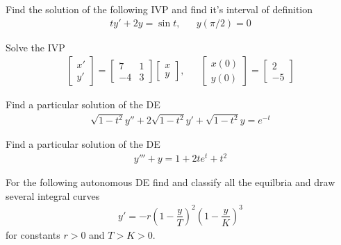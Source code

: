 \documentclass[11pt]{exam}
\begin{document}
\begin{questions}
		\addpoints
		\question[25] Find the solution of the following IVP and find it's interval of definition
		\begin{align*}
			ty' + 2y = \sin t, &   & y(\pi / 2) = 0
		\end{align*}
		\newpage







		\addpoints
		\question[25] Solve the IVP
		\begin{align*}
			\begin{bmatrix} x' \\ y' \end{bmatrix} = \begin{bmatrix} 7 & 1 \\ -4 & 3\end{bmatrix} \begin{bmatrix} x \\ y\end{bmatrix}, &&\begin{bmatrix} x(0) \\ y(0) \end{bmatrix} = \begin{bmatrix} 2 \\ -5\end{bmatrix}
		\end{align*}
		\newpage







		\addpoints
		\question[25] Find a particular solution of the DE
		\begin{align*}
			\sqrt{1 - t ^ 2} y'' + 2 \sqrt{1 - t ^ 2} y' + \sqrt{1 - t ^ 2}y = e ^ {-t}
		\end{align*}
		\newpage






		\addpoints
		\question[25] Find a particular solution of the DE
		\begin{align*}
			y''' + y = 1 + 2t e ^ t + t ^ 2
		\end{align*}
		\newpage








		\addpoints
		\question[25] For the following autonomous DE find and classify all the equilbria and draw several integral curves
		\begin{align*}
			y' = -r \left( 1 - \dfrac{y}{T} \right) ^ 2\left( 1 - \dfrac{y}{K} \right) ^ 3
		\end{align*}
		for constants $ r > 0 $ and $ T > K > 0 $.
		\newpage



	\end{questions}
\end{document}
